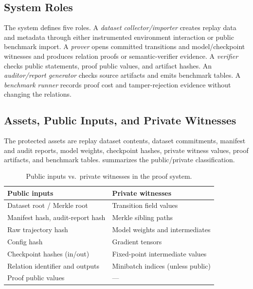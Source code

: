
\subsection{System Roles}

The system defines five roles. A \emph{dataset collector/importer} creates
replay data and metadata through either instrumented environment interaction or
public benchmark import. A \emph{prover} opens committed transitions and
model/checkpoint witnesses and produces relation proofs or semantic-verifier
evidence. A \emph{verifier} checks public statements, proof public values, and
artifact hashes. An \emph{auditor/report generator} checks source artifacts and
emits benchmark tables. A \emph{benchmark runner} records proof cost and
tamper-rejection evidence without changing the relations.

\subsection{Assets, Public Inputs, and Private Witnesses}

The protected assets are replay dataset contents, dataset commitments, manifest
and audit reports, model weights, checkpoint hashes, private witness values,
proof artifacts, and benchmark tables.  summarizes the
public/private classification.

\begin{table}[!t]
\centering
\small
\caption{Public inputs vs.\ private witnesses in the proof system.}
\label{tab:public-private}
\begin{tabular}{p{3.8cm}p{3.8cm}}
\toprule
\textbf{Public inputs} & \textbf{Private witnesses} \\
\midrule
Dataset root / Merkle root &
Transition field values \\
Manifest hash, audit-report hash &
Merkle sibling paths \\
Raw trajectory hash &
Model weights and intermediates \\
Config hash &
Gradient tensors \\
Checkpoint hashes (in/out) &
Fixed-point intermediate values \\
Relation identifier and outputs &
Minibatch indices (unless public) \\
Proof public values &
--- \\
\bottomrule
\end{tabular}
\end{table}


